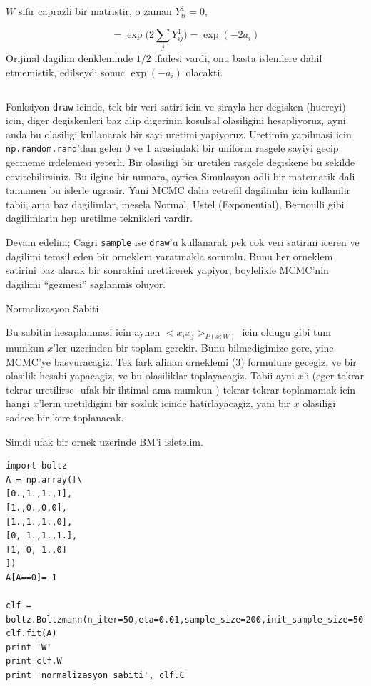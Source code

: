 \documentclass[12pt,fleqn]{article}\usepackage{../common}
\begin{document}
$W$ sifir caprazli bir matristir, o zaman $Y_{ii}^1=0$, 

$$ 
= \exp \big( 2 \sum_{j} Y_{ij}^1 \big) = \exp (- 2 a_i )
 $$
Orijinal dagilim denkleminde $1/2$ ifadesi vardi, onu basta islemlere dahil
etmemistik, edilseydi sonuc  $\exp (- a_i)$ olacakti. 

\inputminted[fontsize=\footnotesize]{python}{boltz.py}

Fonksiyon \verb!draw! icinde, tek bir veri satiri icin ve sirayla her
degisken (hucreyi) icin, diger degiskenleri baz alip digerinin kosulsal
olasiligini hesapliyoruz, ayni anda bu olasiligi kullanarak bir sayi
uretimi yapiyoruz. Uretimin yapilmasi icin \verb!np.random.rand!'dan gelen
0 ve 1 arasindaki bir uniform rasgele sayiyi gecip gecmeme irdelemesi
yeterli. Bir olasiligi bir uretilen rasgele degiskene bu sekilde
cevirebilirsiniz. Bu ilginc bir numara, ayrica Simulasyon adli bir
matematik dali tamamen bu islerle ugrasir. Yani MCMC daha cetrefil
dagilimlar icin kullanilir tabii, ama baz dagilimlar, mesela Normal, Ustel
(Exponential), Bernoulli gibi dagilimlarin hep uretilme teknikleri vardir. 

Devam edelim; Cagri \verb!sample! ise \verb!draw!'u kullanarak pek cok veri
satirini iceren ve dagilimi temsil eden bir orneklem yaratmakla
sorumlu. Bunu her orneklem satirini baz alarak bir sonrakini urettirerek
yapiyor, boylelikle MCMC'nin dagilimi ``gezmesi'' saglanmis oluyor.

Normalizasyon Sabiti

Bu sabitin hesaplanmasi icin aynen $<x_ix_j>_{P(x;W)}$ icin oldugu gibi tum
mumkun $x$'ler uzerinden bir toplam gerekir. Bunu bilmedigimize gore, yine
MCMC'ye basvuracagiz. Tek fark alinan orneklemi (3) formulune gecegiz, ve
bir olasilik hesabi yapacagiz, ve bu olasiliklar toplayacagiz. Tabii ayni
$x$'i (eger tekrar tekrar uretilirse -ufak bir ihtimal ama mumkun-) tekrar
tekrar toplamamak icin hangi $x$'lerin uretildigini bir sozluk icinde
hatirlayacagiz, yani bir $x$ olasiligi sadece bir kere toplanacak. 

Simdi ufak bir ornek uzerinde BM'i isletelim. 

\begin{verbatim}
import boltz
A = np.array([\
[0.,1.,1.,1],
[1.,0.,0,0],
[1.,1.,1.,0],
[0, 1.,1.,1.],
[1, 0, 1.,0]
])
A[A==0]=-1

clf = boltz.Boltzmann(n_iter=50,eta=0.01,sample_size=200,init_sample_size=50)
clf.fit(A)
print 'W'
print clf.W
print 'normalizasyon sabiti', clf.C
\end{verbatim}
\end{document}
